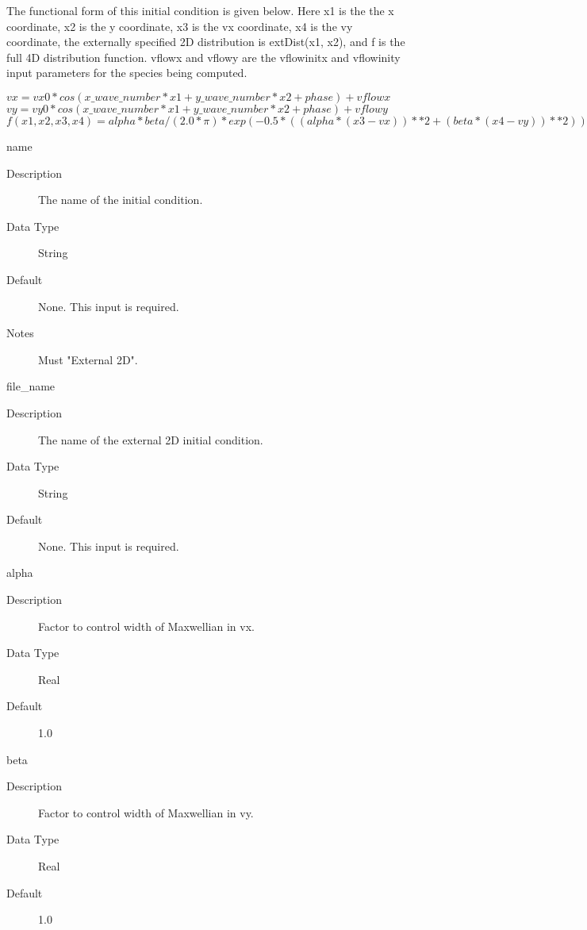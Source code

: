 \documentclass[11pt]{amsart}
\begin{document}
The functional form of this initial condition is given below.  Here x1 is the
the x coordinate, x2 is the y coordinate, x3 is the vx coordinate, x4 is the vy
coordinate, the externally specified 2D distribution is extDist(x1, x2), and f
is the full 4D distribution function.  vflowx and vflowy are the vflowinitx and
vflowinity input parameters for the species being computed.

\begin{math}vx = vx0*cos(x\_wave\_number*x1+y\_wave\_number*x2+phase)+vflowx\end{math} \\
\begin{math}vy = vy0*cos(x\_wave\_number*x1+y\_wave\_number*x2+phase)+vflowy\end{math} \\
\begin{math}f(x1,x2,x3,x4) = alpha*beta/(2.0*\pi)*
  exp(-0.5*((alpha*(x3-vx))**2+(beta*(x4-vy))**2))*extDist(x1,x2)\end{math}

name
\begin{description}
\item [Description] The name of the initial condition.
\item [Data Type] String
\item [Default] None.  This input is required.
\item [Notes] Must "External 2D".
\end{description}

file\_name
\begin{description}
\item [Description] The name of the external 2D initial condition.
\item [Data Type] String
\item [Default] None.  This input is required.
\end{description}

alpha
\begin{description}
\item [Description] Factor to control width of Maxwellian in vx.
\item [Data Type] Real
\item [Default] 1.0
\end{description}

beta
\begin{description}
\item [Description] Factor to control width of Maxwellian in vy.
\item [Data Type] Real
\item [Default] 1.0
\end{description}
\end{document}
